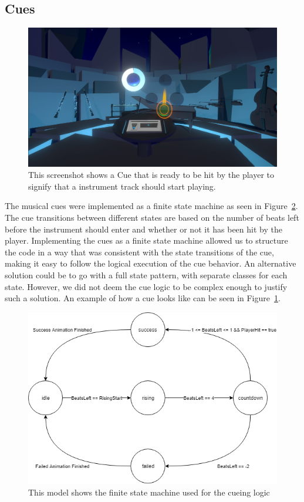 \subsection{Cues}
\begin{figure}[tbph]
    \centering
    \includegraphics[width=1.0\textwidth]{images/cue}
    \caption[Screenshot of a Cue]{This screenshot shows a Cue that is ready to be hit by the player to signify that a instrument track should start playing.}
    \label{fig:cue}
\end{figure}

The musical cues were implemented as a finite state machine as seen in Figure~\ref{fig:cue_fsm}. The cue transitions between different states are based on the number of beats left before the instrument should enter and whether or not it has been hit by the player. Implementing the cues as a finite state machine allowed us to structure the code in a way that was consistent with the state transitions of the cue, making it easy to follow the logical execution of the cue behavior. 
An alternative solution could be to go with a full state pattern\cite{game_programming_patterns}, with separate classes for each state. However, we did not deem the cue logic to be complex enough to justify such a solution. An example of how a cue looks like can be seen in Figure~\ref{fig:cue}.

\begin{figure}[tbph]
    \centering
    \includegraphics[width=1.0\textwidth]{images/cue_fsm}
    \caption[Cue Finite State Machine]{This model shows the finite state machine used for the cueing logic}
    \label{fig:cue_fsm}
\end{figure}


